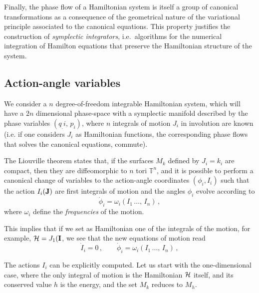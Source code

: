Finally, the phase flow of a Hamiltonian system is itself a group of canonical transformations as a consequence of the geometrical nature of the variational principle associated to the canonical equations. This property justifies the construction of \textit{symplectic integrators}, i.e.\ algorithms for the numerical integration of Hamilton equations that preserve the Hamiltonian structure of the system.


\subsection{Action-angle variables}

We consider a $n$ degree-of-freedom integrable Hamiltonian system, which will have a $2n$ dimensional phase-space with a symplectic manifold described by the phase variables $(q_.i,\,p_i)$, where $n$ integrals of motion $J_i$ in involution are known (i.e. if one considers $J_i$ as Hamiltonian functions, the corresponding phase flows that solves the canonical equations, commute).

The Liouville theorem states that, if the surfaces $M_{k}$ defined by $J_i=k_i$ are compact, then they are diffeomorphic to $n$ tori $\mathbb{T}^n$, and it is possible to perform a canonical change of variables to the action-angle coordinates $(\phi_i,I_i)$ such that the action $I_i(\vb{J})$ are first integrals of motion and the angles $\phi_i$ evolve according to
\begin{equation}
    \dot{\phi}_i = \omega_i(I_1\,\dots,\,I_n)\,, 
\end{equation}
where $\omega_i$ define the \textit{frequencies} of the motion.

This implies that if we set as Hamiltonian one of the integrals of the motion, for example, $\mathcal{H}=J_1(\vb{I}$, we see that the new equations of motion read
\begin{equation} 
    \dot I_i = 0\,, \qquad \dot \phi_i = \omega_i(I_1\,\dots,\,I_n) \,,
\end{equation} 


The actions $I_i$ can be explicitly computed. Let us start with the one-di\-men\-sio\-nal case, where the only integral of motion is the Hamiltonian $\mathcal{H}$ itself, and its conserved value $h$ is the energy, and the set $M_k$ reduces to $M_h$.

